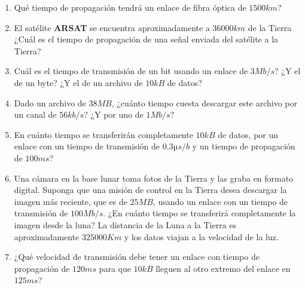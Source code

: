 \documentclass[12pt]{article}
\begin{document}
\begin{enumerate}

    \item Qué tiempo de propagación tendrá un enlace de fibra óptica de $1500
        km$?

    \item El satélite \textbf{ARSAT} se encuentra aproximadamente a $36000 km$
        de la Tierra ¿Cuál es el tiempo de propagación de una señal enviada
        del satélite a la Tierra?

    \item Cuál es el tiempo de transmisión de un bit usando un enlace de $3
        Mb/s$? ¿Y el de un byte? ¿Y el de un archivo de $10 kB$ de datos?

    \item Dado un archivo de $38 MB$, ¿cuánto tiempo cuesta descargar este
        archivo por un canal de $56kb/s$? ¿Y por uno de $1Mb/s$?

    \item En cuánto tiempo se transferirán completamente $10 kB$ de datos, por
        un enlace con un tiempo de transmisión de $0.3 µs/b$ y un tiempo de
        propagación de $100 ms$?

    \item Una cámara en la base lunar toma fotos de la Tierra y las graba en
        formato digital. Suponga que una misión de control en la Tierra desea
        descargar la imagen más reciente, que es de $25 MB$, usando un enlace
        con un tiempo de transmisión de $100 Mb/s$. ¿En cuánto tiempo se
        transferirá completamente la imagen desde la luna? La distancia de la
        Luna a la Tierra es aproximadamente $325000 Km$ y los datos viajan a
        la velocidad de la luz.

    \item ¿Qué velocidad de transmisión debe tener un enlace con tiempo de
        propagación de $120 ms$ para que $10 kB$ lleguen al otro extremo del
        enlace en $125 ms$?

\end{enumerate}
\end{document}
